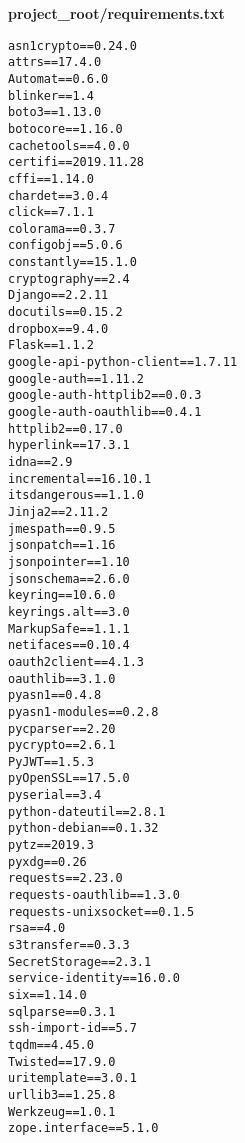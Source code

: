 \documentclass{article}
\begin{document}
    

\textbf{project\_root/requirements.txt}
\begin{verbatim}
asn1crypto==0.24.0
attrs==17.4.0
Automat==0.6.0
blinker==1.4
boto3==1.13.0
botocore==1.16.0
cachetools==4.0.0
certifi==2019.11.28
cffi==1.14.0
chardet==3.0.4
click==7.1.1
colorama==0.3.7
configobj==5.0.6
constantly==15.1.0
cryptography==2.4
Django==2.2.11
docutils==0.15.2
dropbox==9.4.0
Flask==1.1.2
google-api-python-client==1.7.11
google-auth==1.11.2
google-auth-httplib2==0.0.3
google-auth-oauthlib==0.4.1
httplib2==0.17.0
hyperlink==17.3.1
idna==2.9
incremental==16.10.1
itsdangerous==1.1.0
Jinja2==2.11.2
jmespath==0.9.5
jsonpatch==1.16
jsonpointer==1.10
jsonschema==2.6.0
keyring==10.6.0
keyrings.alt==3.0
MarkupSafe==1.1.1
netifaces==0.10.4
oauth2client==4.1.3
oauthlib==3.1.0
pyasn1==0.4.8
pyasn1-modules==0.2.8
pycparser==2.20
pycrypto==2.6.1
PyJWT==1.5.3
pyOpenSSL==17.5.0
pyserial==3.4
python-dateutil==2.8.1
python-debian==0.1.32
pytz==2019.3
pyxdg==0.26
requests==2.23.0
requests-oauthlib==1.3.0
requests-unixsocket==0.1.5
rsa==4.0
s3transfer==0.3.3
SecretStorage==2.3.1
service-identity==16.0.0
six==1.14.0
sqlparse==0.3.1
ssh-import-id==5.7
tqdm==4.45.0
Twisted==17.9.0
uritemplate==3.0.1
urllib3==1.25.8
Werkzeug==1.0.1
zope.interface==5.1.0
\end{verbatim}
\end{document}
